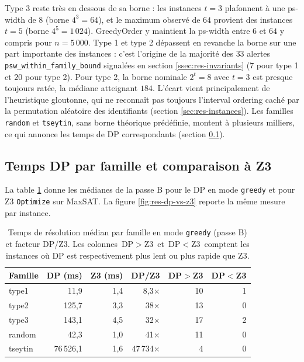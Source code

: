 \documentclass[11pt,a4paper]{report}
\theoremstyle{plain}
\theoremstyle{definition}
\begin{document}
Type 3 reste très en dessous de sa borne : les instances $t = 3$
plafonnent à une ps-width de $8$ (borne $4^3 = 64$), et le maximum
observé de $64$ provient des instances $t = 5$ (borne $4^5 = 1\,024$).
GreedyOrder y maintient la ps-width entre $6$ et $64$ y compris pour
$n = 5\,000$. Type 1 et type 2 dépassent en revanche la borne sur
une part importante des instances : c'est l'origine de la majorité
des $33$ alertes \texttt{psw\_within\_family\_bound} signalées en
section \ref{ssec:res-invariants} ($7$ pour type 1 et $20$ pour
type 2). Pour
type 2, la borne nominale $2^t = 8$ avec $t = 3$ est presque
toujours ratée, la médiane atteignant $184$. L'écart vient
principalement de l'heuristique gloutonne, qui ne reconnaît pas
toujours l'interval ordering caché par la permutation aléatoire des
identifiants (section \ref{sec:res-instances}). Les familles
\texttt{random} et \texttt{tseytin}, sans borne théorique
prédéfinie, montent à plusieurs milliers, ce qui annonce les temps
de DP correspondants (section \ref{ssec:res-temps}).

\subsection{Temps DP par famille et comparaison à Z3}
\label{ssec:res-temps}

La table \ref{tab:res-dp-vs-z3} donne les médianes de la passe B
pour le DP en mode \texttt{greedy} et pour Z3 \texttt{Optimize}
sur MaxSAT. La figure \ref{fig:res-dp-vs-z3} reporte la même
mesure par instance.

\begin{table}[htbp]
\centering
\caption{Temps de résolution médian par famille en mode
\texttt{greedy} (passe B) et facteur DP/Z3. Les colonnes
\og\,DP$>$Z3\,\fg{} et \og\,DP$<$Z3\,\fg{} comptent les instances
où DP est respectivement plus lent ou plus rapide que Z3.}
\label{tab:res-dp-vs-z3}
\begin{tabular}{lrrrrr}
\toprule
Famille & DP (ms) & Z3 (ms) & DP/Z3 & DP$>$Z3 & DP$<$Z3 \\
\midrule
type1   & 11{,}9    & 1{,}4 & 8{,}3$\times$       & 10 & 1 \\
type2   & 125{,}7   & 3{,}3 & 38$\times$          & 13 & 0 \\
type3   & 143{,}1   & 4{,}5 & 32$\times$          & 17 & 2 \\
random  & 42{,}3    & 1{,}0 & 41$\times$          & 11 & 0 \\
tseytin & 76\,526{,}1 & 1{,}6 & 47\,734$\times$   & 4  & 0 \\
\bottomrule
\end{tabular}
\end{table}
\end{document}
